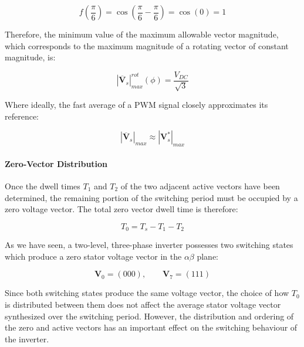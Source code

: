 \documentclass{article}
\begin{document}
\begin{equation}
    f(\frac{\pi}{6}) = \cos(\frac{\pi}{6} - \frac{\pi}{6}) = \cos(0) = 1
\end{equation}

Therefore, the minimum value of the maximum allowable vector magnitude, which corresponds to the maximum magnitude of a rotating vector of constant magnitude, is:

\begin{equation}
    |\overline{\mathbf{V}}_s|_{max}^{rot}(\phi) = \frac{V_{DC}}{\sqrt{3}}
\end{equation}

Where ideally, the fast average of a PWM signal closely approximates its reference:

\begin{equation}
    |\overline{\mathbf{V}}_s|_{max} \approx |\mathbf{V}_s^*|_{max}
\end{equation}

\paragraph{Zero-Vector Distribution}
\label{sec:zero-vector-distribution}

Once the dwell times $T_1$ and $T_2$ of the two adjacent active vectors have been determined, the remaining portion of the switching period must be occupied by a zero voltage vector. The total zero vector dwell time is therefore:

\begin{equation}
    T_0 = T_s - T_1 - T_2
\end{equation}

As we have seen, a two-level, three-phase inverter possesses two switching states which produce a zero stator voltage vector in the $\alpha\beta$ plane:

\begin{equation}
    \mathbf{V}_0 = (000), \qquad
    \mathbf{V}_7 = (111)
\end{equation}

Since both switching states produce the same voltage vector, the choice of how $T_0$ is distributed between them does not affect the average stator voltage vector synthesized over the switching period. However, the distribution and ordering of the zero and active vectors has an important effect on the switching behaviour of the inverter.
\end{document}
